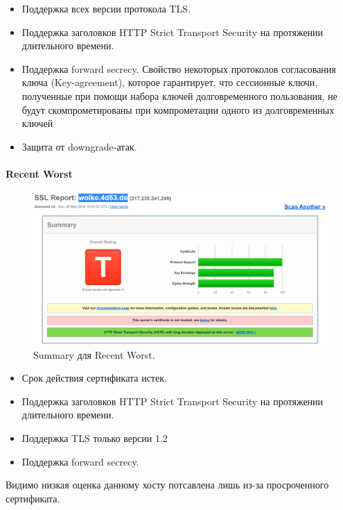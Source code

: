 \documentclass[10pt,a4paper]{article}
\begin{document}
\begin{itemize}
\item{Поддержка всех версии протокола TLS.}
\item{Поддержка заголовков HTTP Strict Transport Security на протяжении длительного времени.}
\item{Поддержка forward secrecy. Свойство некоторых протоколов согласования ключа (Key-agreement), которое гарантирует, что сессионные ключи, полученные при помощи набора ключей долговременного пользования, не будут скомпрометированы при компрометации одного из долговременных ключей}
\item{Защита от downgrade-атак.}
\end{itemize}

\paragraph {Recent Worst\\}

\begin{figure}[h]
\centering
\includegraphics[width=\textwidth]{wolke_4d53_de_summary}
\caption{Summary для Recent Worst.}
\end{figure}

\begin{itemize}
\item{Срок действия сертификата истек.}
\item{Поддержка заголовков HTTP Strict Transport Security на протяжении длительного времени.}
\item{Поддержка TLS только версии 1.2}
\item{Поддержка forward secrecy. }
\end{itemize}

Видимо низкая оценка данному хосту потсавлена лишь из-за просроченного сертификата.

\newpage
\end{document}
